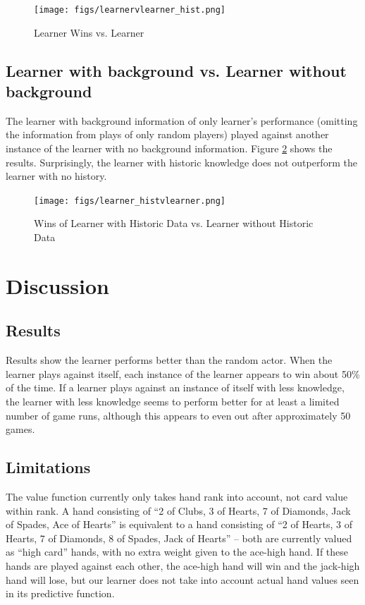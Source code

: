 \documentclass[12pt,pdftex]{article}
\begin{document}
\begin{figure}[ht!]
	\begin{center}
		\texttt{[image: figs/learnervlearner\_hist.png]}
		\caption{Learner Wins vs. Learner}
		\label{fig:learn_v_learn_hist}
\end{center}
\end{figure}

\subsection{Learner with background vs. Learner without background}
The learner with background information of only learner's performance (omitting the information from plays of only random players) played against another instance of the learner with no background information. 
Figure \ref{fig:learn_hist_v_learn} shows the results. 
Surprisingly, the learner with historic knowledge does not outperform the learner with no history.

\begin{figure}[ht!]
	\begin{center}
		\texttt{[image: figs/learner\_histvlearner.png]}
		\caption{Wins of Learner with Historic Data vs. Learner without Historic Data}
		\label{fig:learn_hist_v_learn}
\end{center}
\end{figure}

\section{Discussion} \label{sec:disc}
\subsection{Results}
Results show the learner performs better than the random actor. 
When the learner plays against itself, each instance of the learner appears to win about 50\% of the time.
If a learner plays against an instance of itself with less knowledge, the learner with less knowledge seems to perform better for at least a limited number of game runs, although this appears to even out after approximately 50 games.

\subsection{Limitations}
\label{subsec:limit}
The value function currently only takes hand rank into account, not card value within rank. A hand consisting of ``2 of Clubs, 3 of Hearts, 7 of Diamonds, Jack of Spades, Ace of Hearts'' is equivalent to a hand consisting of ``2 of Hearts, 3 of Hearts, 7 of Diamonds, 8 of Spades, Jack of Hearts'' -- both are currently valued as ``high card'' hands, with no extra weight given to the ace-high hand. 
If these hands are played against each other, the ace-high hand will win and the jack-high hand will lose, but our learner does not take into account actual hand values seen in its predictive function.
\end{document}

